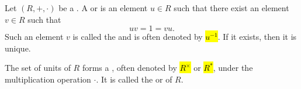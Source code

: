 \begin{definition} \label{definition:unit_of_a_ring}
    Let $(R,+,\cdot)$ be a . A  or  is an element $u \in R$ such that there exist an element $v \in R$ such that 
    $$uv = 1 = vu.$$ 
    Such an element $v$ is called the  and is often denoted by \hl{$u^{-1}$}. If it exists, then it is unique.
    
    The set of units of $R$ forms a , often denoted by \hl{$R^\times$} or \hl{$R^*$}, under the multiplication operation $\cdot$. It is called the  or  of $R$.
\end{definition}
